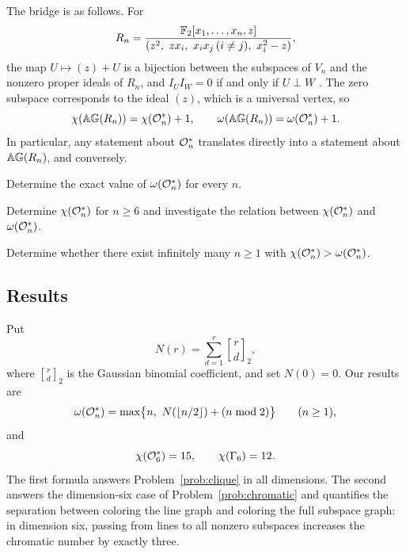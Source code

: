 The bridge is as follows.  For
\[
R_n=\frac{\F[x_1,\dots,x_n,z]}{(z^2,\ zx_i,\ x_ix_j\,(i\ne j),\
x_i^2-z)},
\]
the map \(U\mapsto (z)+U\) is a bijection between the subspaces of
\(V_n\) and the nonzero proper ideals of \(R_n\), and
\(I_UI_W=0\) if and only if \(U\perp W\) \cite{Nikandish2026}.  The
zero subspace corresponds to the ideal \((z)\), which is a universal
vertex, so
\[
\chi(\mathbb{AG}(R_n))=\chi(\mathcal O_n^*)+1,\qquad
\omega(\mathbb{AG}(R_n))=\omega(\mathcal O_n^*)+1 .
\]
In particular, any statement about \(\mathcal O_n^*\) translates directly
into a statement about \(\mathbb{AG}(R_n)\), and conversely.

\begin{problem}\label{prob:clique}
Determine the exact value of \(\omega(\mathcal O_n^*)\) for every \(n\).
\end{problem}

\begin{problem}\label{prob:chromatic}
Determine \(\chi(\mathcal O_n^*)\) for \(n\ge6\) and investigate the relation
between \(\chi(\mathcal O_n^*)\) and \(\omega(\mathcal O_n^*)\).
\end{problem}

\begin{problem}\label{prob:infinite}
Determine whether there exist infinitely many \(n\ge1\) with
\(\chi(\mathcal O_n^*)>\omega(\mathcal O_n^*)\).
\end{problem}

\subsection*{Results}

Put
\[
N(r)=\sum_{d=1}^{r}\genfrac{[}{]}{0pt}{}{r}{d}_2,
\]
where \(\genfrac{[}{]}{0pt}{}{r}{d}_2\) is the Gaussian binomial coefficient, and set
\(N(0)=0\).  Our results are
\begin{equation}\label{eq:clique-formula}
\omega(\mathcal O_n^*)=\max\bigl\{n,\ N(\lfloor n/2\rfloor)+(n\bmod 2)\bigr\}
\qquad(n\ge1),
\end{equation}
and
\begin{equation}\label{eq:chromatic-six}
\chi(\mathcal O_6^*)=15,\qquad \chi(\Gamma_6)=12 .
\end{equation}
The first formula answers Problem~\ref{prob:clique} in all
dimensions.  The second answers the dimension-six case of
Problem~\ref{prob:chromatic} and quantifies the separation between
coloring the line graph and coloring the full subspace graph: in
dimension six, passing from lines to all nonzero subspaces increases
the chromatic number by exactly three.

